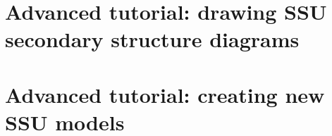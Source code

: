 \begin{comment}
\item Use \prog{mybac.cm} as the CM file when running
  \textsc{SSUalign}. This is recommended if you believe all of your
  SSU sequences are bacterial SSU sequences within the specified
  region (consensus positions 35 to 397). 

\item Use \prog{mybac.cm} as one of several models in a multi-model CM
  file when running \textsc{SSUalign}. You can create multi-model CM
  files by simply concatenating them together. For example you can add
  it as a sixth model to the default \textsc{SSUalign} 0.1 five model
  CM file \prog{sa.01.abcem.cm} with: \user{cat sa.01.abcem.cm
    mybac.cm > six.cm}. This is recommended if you think only some of
  your sequences will be within the specified region (consensus
  positions 35 to 397), while others might be full length bacterial
  sequences, or even archaeal or eukaryotic sequences.

\end{enumerate}

Now let's try aligning some sequences with the new model. The file
\prog{partial.fa} is a contrived set of sequences, most of which match
to the 35-397 region of bacterial SSU, but some which match to the
analogous region in archaeal SSU. Running \textsc{ssu-align} on this
dataset will help demonstrate some important points. First let's build
a new CM file with 2 CMs, our new \prog{mybac.cm} model and the default
Archaeal model. This is as simple as concatenating the two
single model CM files:

\prog{cat mybac.cm Archaeal.cm >> my2.cm}

Now use it align the sequences in \prog{partial.fa}:

\prog{cat mybac.cm Archaeal.cm >> my2.cm}
\end{comment}

\section{Advanced tutorial: drawing SSU secondary structure diagrams}
\section{Advanced tutorial: creating new SSU models}
